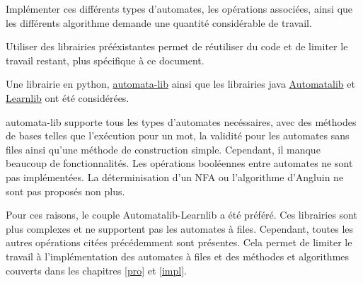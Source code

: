 Implémenter ces différents types d'automates, les opérations associées, ainsi que les différents algorithme demande une quantité considérable de travail.

Utiliser des librairies prééxistantes permet de réutiliser du code et de limiter le travail restant, plus spécifique à ce document.

Une librairie en python, \href{https://pypi.org/project/automata-lib/}{automata-lib} ainsi que les librairies java \href{https://learnlib.de/projects/automatalib/}{Automatalib} et \href{https://learnlib.de/}{Learnlib} ont été considérées.

automata-lib supporte tous les types d'automates necéssaires, avec des méthodes de bases telles que l'exécution pour un mot, la validité pour les automates sans files ainsi qu'une méthode de construction simple. Cependant, il manque beaucoup de fonctionnalités. Les opérations booléennes entre automates ne sont pas implémentées. La déterminisation d'un NFA ou l'algorithme d'Angluin ne sont pas proposés non plus.

Pour ces raisons, le couple Automatalib-Learnlib a été préféré. Ces librairies sont plus complexes et ne supportent pas les automates à files. Cependant, toutes les autres opérations citées précédemment sont présentes. Cela permet de limiter le travail à l'implémentation des automates à files et des méthodes et algorithmes couverts dans les chapitres \ref{pro} et \ref{impl}.
